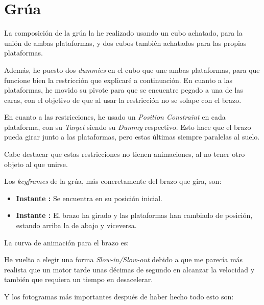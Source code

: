 \section{Grúa}

La composición de la grúa la he realizado usando un cubo achatado, para la unión de ambas plataformas, y dos cubos también achatados para las propias plataformas.

\bigskip

Además, he puesto dos \textit{dummies} en el cubo que une ambas plataformas, para que funcione bien la restricción que explicaré a continuación. En cuanto a las plataformas, he movido su pivote para que se encuentre pegado a una de las caras, con el objetivo de que al usar la restricción no se solape con el brazo.

\bigskip

En cuanto a las restricciones, he usado un \textit{Position Constraint} en cada plataforma, con su \textit{Target} siendo su \textit{Dummy} respectivo. Esto hace que el brazo pueda girar junto a las plataformas, pero estas últimas siempre paralelas al suelo.

\bigskip

Cabe destacar que estas restricciones no tienen animaciones, al no tener otro objeto al que unirse.



Los \textit{keyframes} de la grúa, más concretamente del brazo que gira, son:

\begin{itemize}
    \item \textbf{Instante : }Se encuentra en su posición inicial.
    \item \textbf{Instante : }El brazo ha girado y las plataformas han cambiado de posición, estando arriba la de abajo y viceversa.
\end{itemize}

\bigskip

La curva de animación para el brazo es:



He vuelto a elegir una forma \textit{Slow-in/Slow-out} debido a que me parecía más realista que un motor tarde unas décimas de segundo en alcanzar la velocidad y también que requiera un tiempo en desacelerar.

\bigskip

Y los fotogramas más importantes después de haber hecho todo esto son:

